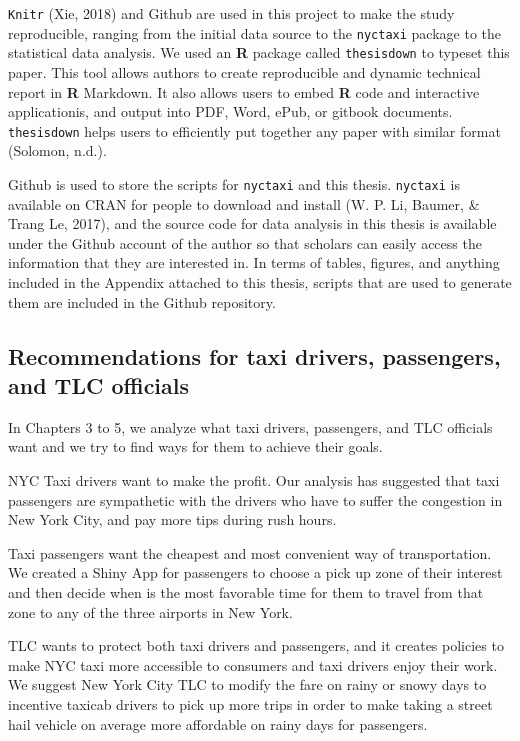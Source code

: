 \documentclass[12pt,twoside]{reedthesis}
\theoremstyle{definition}
\theoremstyle{definition}
\theoremstyle{definition}
\theoremstyle{remark}
\begin{document}
\texttt{Knitr} (Xie, 2018) and Github are used in this project to make
the study reproducible, ranging from the initial data source to the
\texttt{nyctaxi} package to the statistical data analysis. We used an
\textbf{R} package called \texttt{thesisdown} to typeset this paper.
This tool allows authors to create reproducible and dynamic technical
report in \textbf{R} Markdown. It also allows users to embed \textbf{R}
code and interactive applicationis, and output into PDF, Word, ePub, or
gitbook documents. \texttt{thesisdown} helps users to efficiently put
together any paper with similar format (Solomon, n.d.).

Github is used to store the scripts for \texttt{nyctaxi} and this
thesis. \texttt{nyctaxi} is available on CRAN for people to download and
install (W. P. Li, Baumer, \& Trang Le, 2017), and the source code for
data analysis in this thesis is available under the Github account of
the author so that scholars can easily access the information that they
are interested in. In terms of tables, figures, and anything included in
the Appendix attached to this thesis, scripts that are used to generate
them are included in the Github repository.

\subsection{Recommendations for taxi drivers, passengers, and TLC
officials}\label{recommendations-for-taxi-drivers-passengers-and-tlc-officials}

In Chapters 3 to 5, we analyze what taxi drivers, passengers, and TLC
officials want and we try to find ways for them to achieve their goals.

NYC Taxi drivers want to make the profit. Our analysis has suggested
that taxi passengers are sympathetic with the drivers who have to suffer
the congestion in New York City, and pay more tips during rush hours.

Taxi passengers want the cheapest and most convenient way of
transportation. We created a Shiny App for passengers to choose a pick
up zone of their interest and then decide when is the most favorable
time for them to travel from that zone to any of the three airports in
New York.

TLC wants to protect both taxi drivers and passengers, and it creates
policies to make NYC taxi more accessible to consumers and taxi drivers
enjoy their work. We suggest New York City TLC to modify the fare on
rainy or snowy days to incentive taxicab drivers to pick up more trips
in order to make taking a street hail vehicle on average more affordable
on rainy days for passengers.
\end{document}

